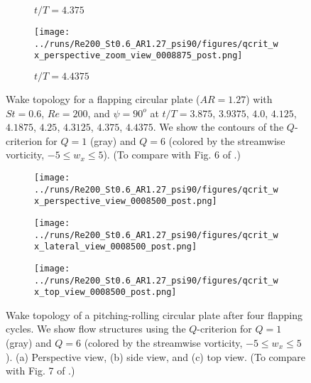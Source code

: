 \begin{figure}
\begin{subfigure}[b]{0.3\textwidth}
    \caption{$t / T = 4.375$}
  \end{subfigure}
  \hfill
  \begin{subfigure}[b]{0.3\textwidth}
    \centering
    \texttt{[image: ../runs/Re200\_St0.6\_AR1.27\_psi90/figures/qcrit\_wx\_perspective\_zoom\_view\_0008875\_post.png]}
    \caption{$t / T = 4.4375$}
  \end{subfigure}
  \caption{Wake topology for a flapping circular plate ($AR = 1.27$) with $St = 0.6$, $Re = 200$, and $\psi = 90^o$ at $t / T = 3.875$, $3.9375$, $4.0$, $4.125$, $4.1875$, $4.25$, $4.3125$, $4.375$, $4.4375$. We show the contours of the $Q$-criterion for $Q = 1$ (gray) and $Q = 6$ (colored by the streamwise vorticity, $-5 \leq w_x \leq 5$). (To compare with Fig. 6 of \citet{li_dong_2016}.)}
  \label{fig:baseline_qcrit_perspective}
\end{figure}

\begin{figure}
  \centering
  \begin{minipage}{0.55\linewidth}
    \begin{subfigure}[t]{\linewidth}
      \texttt{[image: ../runs/Re200\_St0.6\_AR1.27\_psi90/figures/qcrit\_wx\_perspective\_view\_0008500\_post.png]}
      \caption{}
    \end{subfigure}
  \end{minipage}
  \begin{minipage}{0.35\linewidth}
    \begin{subfigure}[t]{\linewidth}
      \texttt{[image: ../runs/Re200\_St0.6\_AR1.27\_psi90/figures/qcrit\_wx\_lateral\_view\_0008500\_post.png]}
      \caption{}
    \end{subfigure}
    \vspace{1cm}
    \begin{subfigure}[b]{\linewidth}
      \texttt{[image: ../runs/Re200\_St0.6\_AR1.27\_psi90/figures/qcrit\_wx\_top\_view\_0008500\_post.png]}
      \caption{}
    \end{subfigure}
  \end{minipage}
  \caption{Wake topology of a pitching-rolling circular plate after four flapping cycles. We show flow structures  using the $Q$-criterion for $Q = 1$ (gray) and $Q = 6$ (colored by the streamwise vorticity, $-5 \leq w_x \leq 5$). (a) Perspective view, (b) side view, and (c) top view. (To compare with Fig. 7 of \citet{li_dong_2016}.)}
  \label{fig:baseline_wake_topology}
\end{figure}

